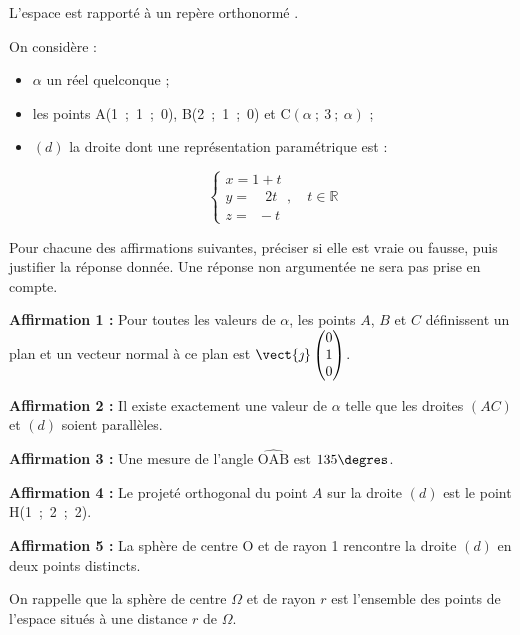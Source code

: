 L'espace est rapporté à un repère orthonormé \Oijk.

On considère :

\begin{itemize}
\item $\alpha$ un réel quelconque ;
\item les points A(1~;~1~;~0), B(2~;~1~;~0) et C$(\alpha~;~3~;~\alpha)$ ;
\item $(d)$ la droite dont une représentation paramétrique est :

\[
\left\{
\begin{array}{l}
x = 1 + t\\
y = \phantom{11} 2t\\
z = \phantom{1}- t
\end{array}
\right., \quad t \in \mathbb{R}
\]
\end{itemize}

Pour chacune des affirmations suivantes, préciser si elle est vraie ou fausse, puis justifier la réponse donnée. Une réponse non argumentée ne sera pas prise en compte.

\textbf{Affirmation 1 :} Pour toutes les valeurs de $\alpha$, les points $A$, $B$ et $C$ définissent un plan et un vecteur normal à ce plan est $\vect{\jmath}\begin{pmatrix}0\\1\\0\end{pmatrix}$.

\textbf{Affirmation 2 :} Il existe exactement une valeur de $\alpha$ telle que les droites $(AC)$ et $(d)$ soient parallèles.

\textbf{Affirmation 3 :} Une mesure de l'angle $\widehat{\text{OAB}}$ est $135\degres$.

\textbf{Affirmation 4 :} Le projeté orthogonal du point $A$ sur la droite $(d)$ est le point H(1~;~2~;~2).

\textbf{Affirmation 5 :} La sphère de centre O et de rayon 1 rencontre la droite $(d)$ en deux points distincts.

On rappelle que la sphère de centre $\Omega$
et de rayon $r$ est l'ensemble des points de l'espace situés à une distance $r$ de $\Omega$.
